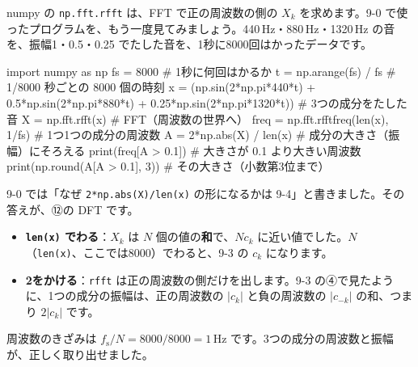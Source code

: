 numpy の \texttt{np.fft.rfft} は、FFT で正の周波数の側の $X_k$ を求めます。9-0 で使ったプログラムを、もう一度見てみましょう。440\,Hz・880\,Hz・1320\,Hz の音を、振幅1・0.5・0.25 でたした音を、1秒に8000回はかったデータです。
\begin{bkcode}[Python]
import numpy as np
fs = 8000                       \# 1秒に何回はかるか
t = np.arange(fs) / fs          \# 1/8000 秒ごとの 8000 個の時刻
x = (np.sin(2*np.pi*440*t) + 0.5*np.sin(2*np.pi*880*t)
     + 0.25*np.sin(2*np.pi*1320*t))   \# 3つの成分をたした音
X = np.fft.rfft(x)              \# FFT（周波数の世界へ）
freq = np.fft.rfftfreq(len(x), 1/fs)  \# 1つ1つの成分の周波数
A = 2*np.abs(X) / len(x)        \# 成分の大きさ（振幅）にそろえる
print(freq[A > 0.1])            \# 大きさが 0.1 より大きい周波数
print(np.round(A[A > 0.1], 3))  \# その大きさ（小数第3位まで）
\end{bkcode}
\begin{bkcodeout}[実行結果]
[ 440.  880. 1320.]
[1.   0.5  0.25]
\end{bkcodeout}
9-0 では「なぜ \texttt{2*np.abs(X)/len(x)} の形になるかは 9-4」と書きました。その答えが、⑫の DFT です。
\begin{itemize}[leftmargin=1.2\zw, itemsep=2pt, topsep=2pt, label={\color{\bkTT}●}]
\item \textbf{\texttt{len(x)} でわる}：$X_k$ は $N$ 個の値の\textbf{和}で、$Nc_k$ に近い値でした。$N$（\texttt{len(x)}、ここでは8000）でわると、9-3 の $c_k$ になります。
\item \textbf{2をかける}：\texttt{rfft} は正の周波数の側だけを出します。9-3 の④で見たように、1つの成分の振幅は、正の周波数の $|c_k|$ と負の周波数の $|c_{-k}|$ の和、つまり $2|c_k|$ です。
\end{itemize}
周波数のきざみは $f_{\mathrm s}/N=8000/8000=1$\,Hz です。3つの成分の周波数と振幅が、正しく取り出せました。

\begin{bkfigure}
\label{bk:9-4:fig-fft}
\end{bkfigure}

